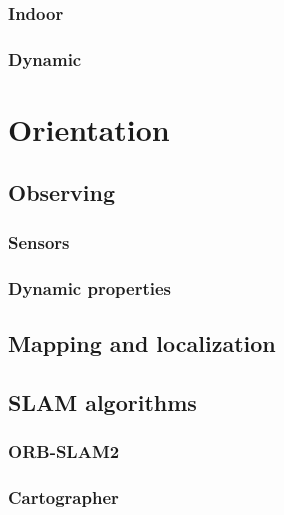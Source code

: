 \documentclass[12pt, a4paper]{report}
\begin{document}
        \subsubsection{Indoor}
        
        \subsubsection{Dynamic}
        
        \newpage
    \section{Orientation}
    
      \subsection{Observing}
      
        \subsubsection{Sensors}
        
        \subsubsection{Dynamic properties}
        
        \newpage
      \subsection{Mapping and localization}
      
      \subsection{SLAM algorithms}
      
        \subsubsection{ORB-SLAM2}
        
        \subsubsection{Cartographer}
        
        \newpage
\end{document}
